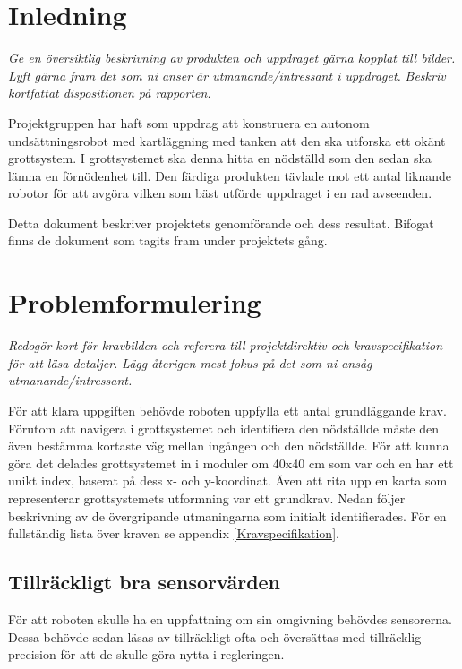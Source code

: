 \documentclass[11pt]{article}
\begin{document}
\begin{flushleft}
\section{Inledning}
\textit{Ge en översiktlig beskrivning av produkten och uppdraget gärna kopplat till bilder.}
\textit{Lyft gärna fram det som ni anser är utmanande/intressant i uppdraget.}
\textit{Beskriv kortfattat dispositionen på rapporten.}

Projektgruppen har haft som uppdrag att konstruera en autonom undsättningsrobot med kartläggning med tanken att den ska utforska ett okänt grottsystem. I grottsystemet ska denna hitta en nödställd som den sedan ska lämna en förnödenhet till. Den färdiga produkten tävlade mot ett antal liknande robotor för att avgöra vilken som bäst utförde uppdraget i en rad avseenden.

Detta dokument beskriver projektets genomförande och dess resultat. Bifogat finns de dokument som tagits fram under projektets gång.

\pagebreak

\section{Problemformulering}
\textit{Redogör kort för kravbilden och referera till projektdirektiv och kravspecifikation för att läsa detaljer.}
\textit{Lägg återigen mest fokus på det som ni ansåg utmanande/intressant.}

För att klara uppgiften behövde roboten uppfylla ett antal grundläggande krav. Förutom att navigera i grottsystemet och identifiera den nödställde måste den även bestämma kortaste väg mellan ingången och den nödställde. För att kunna göra det delades grottsystemet in i moduler om 40x40 cm som var och en har ett unikt index, baserat på dess x- och y-koordinat. Även att rita upp en karta som representerar grottsystemets utformning var ett grundkrav. Nedan följer beskrivning av de övergripande utmaningarna som initialt identifierades. För en fullständig lista över kraven se appendix \ref{Kravspecifikation}.

\subsection{Tillräckligt bra sensorvärden}
För att roboten skulle ha en uppfattning om sin omgivning behövdes sensorerna. Dessa behövde sedan läsas av tillräckligt ofta och översättas med tillräcklig precision för att de skulle göra nytta i regleringen. 


\end{flushleft}
\end{document}
